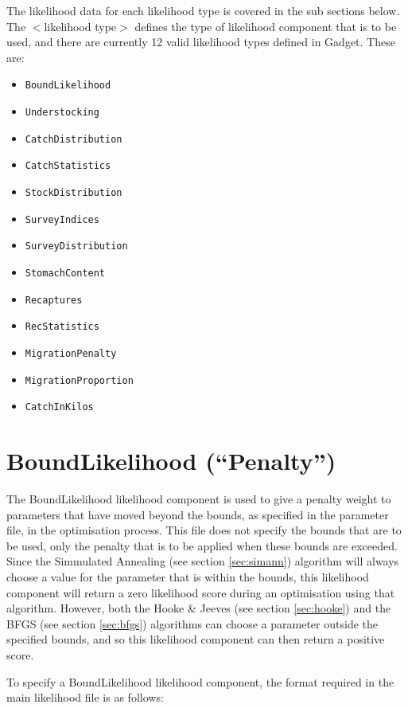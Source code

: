 \documentclass[]{book}
\providecommand{\tightlist}{%
  \setlength{\itemsep}{0pt}\setlength{\parskip}{0pt}}
\begin{document}
The likelihood data for each likelihood type is covered in the sub
sections below. The \(<\)likelihood type\(>\) defines the type of likelihood
component that is to be used, and there are currently 12 valid
likelihood types defined in Gadget. These are:

\begin{itemize}
\tightlist
\item
  \texttt{BoundLikelihood}
\item
  \texttt{Understocking}
\item
  \texttt{CatchDistribution}
\item
  \texttt{CatchStatistics}
\item
  \texttt{StockDistribution}
\item
  \texttt{SurveyIndices}
\item
  \texttt{SurveyDistribution}
\item
  \texttt{StomachContent}
\item
  \texttt{Recaptures}
\item
  \texttt{RecStatistics}
\item
  \texttt{MigrationPenalty}
\item
  \texttt{MigrationProportion}
\item
  \texttt{CatchInKilos}
\end{itemize}

\hypertarget{sec:boundlike}{%
\section{BoundLikelihood (``Penalty'')}\label{sec:boundlike}}

The BoundLikelihood likelihood component is used to give a penalty
weight to parameters that have moved beyond the bounds, as specified in
the parameter file, in the optimisation process. This file does not
specify the bounds that are to be used, only the penalty that is to be
applied when these bounds are exceeded. Since the Simmulated Annealing
(see section \ref{sec:simann}) algorithm will always choose a value for the
parameter that is within the bounds, this likelihood component will
return a zero likelihood score during an optimisation using that
algorithm. However, both the Hooke \& Jeeves (see
section \ref{sec:hooke})
and the BFGS (see section \ref{sec:bfgs}) algorithms can choose a parameter outside the
specified bounds, and so this likelihood component can then return a
positive score.

To specify a BoundLikelihood likelihood component, the format required
in the main likelihood file is as follows:
\end{document}
